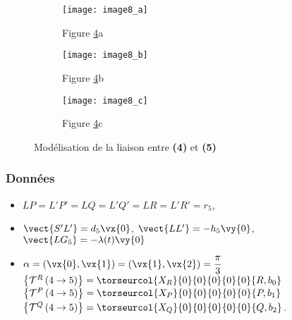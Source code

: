 \begin{figure}[!h]
\centering
    \begin{subfigure}[b]{.3\textwidth}
    \centering
    \texttt{[image: image8\_a]}
    \caption{Figure \ref{fig:CCMP:2021:08}a \label{fig:CCMP:2021:08:a}}
    \end{subfigure}
    \hfill
    \begin{subfigure}[b]{.3\textwidth}
    \centering
    \texttt{[image: image8\_b]}
    \caption{Figure \ref{fig:CCMP:2021:08}b \label{fig:CCMP:2021:08:b}}
    \end{subfigure}
    \hfill
    \begin{subfigure}[b]{.3\textwidth}
    \centering
    \texttt{[image: image8\_c]}
    \caption{Figure \ref{fig:CCMP:2021:08}c \label{fig:CCMP:2021:08:c}}
    \end{subfigure}
\caption{ \label{fig:CCMP:2021:08} Modélisation de la liaison entre \textbf{(4)} et \textbf{(5)}}
\end{figure}


\subsubsection*{Données}
\begin{itemize}
\item $LP=L'P' = LQ  = L'Q' = LR = L'R' = r_5$,
\item $\vect{S'L'} = d_5 \vx{0}$, $\vect{LL'} = -h_5 \vy{0}$, $\vect{LG_5}=-\lambda(t) \vy{0}$
\item $\alpha  =(\vx{0},\vx{1})=(\vx{1},\vx{2})=\dfrac{\pi}{3}$
$\left\{ \mathcal{T}^R \left(4\to 5 \right) \right\} = \torseurcol{X_R}{0}{0}{0}{0}{0}{R,b_0}$
$\left\{ \mathcal{T}^P \left(4\to 5 \right) \right\} = \torseurcol{X_P}{0}{0}{0}{0}{0}{P,b_1}$
$\left\{ \mathcal{T}^Q \left(4\to 5 \right) \right\} = \torseurcol{X_Q}{0}{0}{0}{0}{0}{Q,b_2}$.
\end{itemize}
